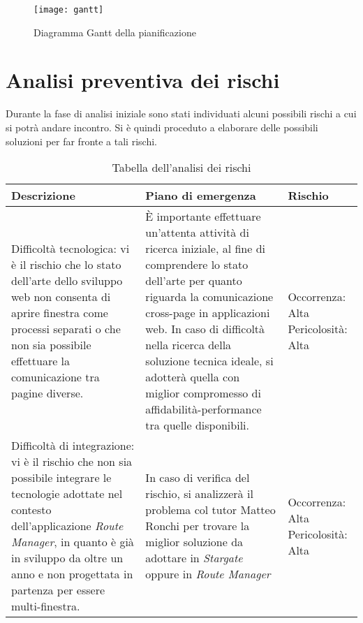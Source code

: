 \begin{figure}[H] 
    \centering 
    \texttt{[image: gantt]} 
    \caption{Diagramma Gantt della pianificazione}
\end{figure}

\section{Analisi preventiva dei rischi}

Durante la fase di analisi iniziale sono stati individuati alcuni possibili rischi a cui si potrà andare incontro.
Si è quindi proceduto a elaborare delle possibili soluzioni per far fronte a tali rischi.\\

\begin{table}[H]
\begin{tabular}{ |p{6cm} |p{6cm} |p{3cm}|}
\hline
\textbf{Descrizione} & \textbf{Piano di emergenza} & \textbf{Rischio} \\ \hline
Difficoltà tecnologica: vi è il rischio che lo stato dell'arte dello sviluppo web non consenta di aprire finestra come processi separati o che non sia possibile effettuare la comunicazione tra pagine diverse. & È importante effettuare un'attenta attività di ricerca iniziale, al fine di comprendere lo stato dell'arte per quanto riguarda la comunicazione cross-page in applicazioni web. \newline In caso di difficoltà nella ricerca della soluzione tecnica ideale, si adotterà quella con miglior compromesso di affidabilità-performance tra quelle disponibili. & Occorrenza: Alta \newline Pericolosità: Alta \\ \hline

Difficoltà di integrazione: vi è il rischio che non sia possibile integrare le tecnologie adottate nel contesto dell'applicazione \textit{Route Manager}, in quanto è già in sviluppo da oltre un anno e non progettata in partenza per essere multi-finestra. & In caso di verifica del rischio, si analizzerà il problema col tutor Matteo Ronchi per trovare la miglior soluzione da adottare in \textit{Stargate} oppure in \textit{Route Manager} & Occorrenza: Alta \newline Pericolosità: Alta \\ \hline
\end{tabular}
\caption{Tabella dell'analisi dei rischi}
\end{table}

